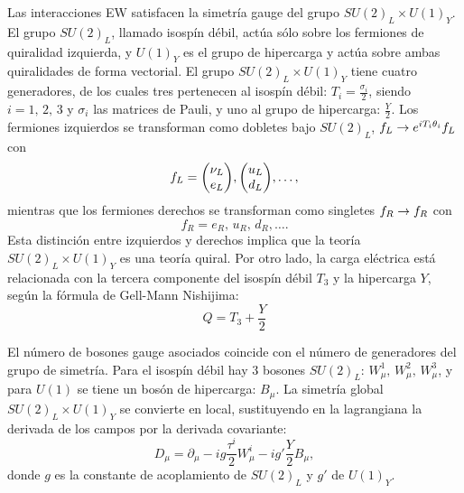 Las interacciones \ac{EW} satisfacen la simetría gauge del grupo \(SU(2)_L \times U(1)_Y\). El grupo \(SU(2)_L\), llamado isospín débil, actúa sólo sobre los fermiones de quiralidad izquierda, y \(U(1)_Y\) es el grupo de hipercarga y actúa sobre ambas quiralidades de forma vectorial.
El grupo \(SU(2)_L \times U(1)_Y\) tiene cuatro generadores, de los cuales tres pertenecen al isospín débil: \(T_i = \frac{\sigma_i}{2}\), siendo \(i = 1,\, 2,\, 3\) y \(\sigma_i\) las matrices de Pauli, y uno al grupo de hipercarga: \(\frac{Y}{2}\). Los fermiones izquierdos se transforman como dobletes bajo \(SU(2)_L\), \(f_L \rightarrow e^{i T_i \theta_i} f_L\) con
\begin{equation}
    f_L = \mqty( \nu_L\\ e_L ), \mqty( u_L\\ d_L ), \dots,
\end{equation}
mientras que los fermiones derechos se transforman como singletes \(f_R \rightarrow f_R\) con
\begin{equation}
    f_R = e_R, \, u_R,\, d_R, \dots.
\end{equation}
Esta distinción entre izquierdos y derechos implica que la teoría \(SU(2)_L \times U(1)_Y\) es una teoría quiral.
Por otro lado, la carga eléctrica está relacionada con la tercera componente del isospín débil \(T_3\) y la hipercarga \(Y\), según la fórmula de Gell-Mann Nishijima:
\begin{equation}
    Q = T_3 + \frac{Y}{2}
\end{equation}

El número de bosones gauge asociados coincide con el número de generadores del grupo de simetría. Para el isospín débil hay 3 bosones \(SU(2)_L\): \(W_{\mu}^1,\, W_{\mu}^2,\, W_{\mu}^3\), y para \(U(1)\) se tiene un bosón de hipercarga: \(B_{\mu}\).
La simetría global \(SU(2)_L \times U(1)_Y\) se convierte en local, sustituyendo en la lagrangiana la derivada de los campos por la derivada covariante:
\begin{equation}
    \label{eq:theory:sm:mathematical:ew:covariant_derivative}
    D_{\mu} = \partial_{\mu} - ig \frac{\tau^i}{2} W_{\mu}^i - i g' \frac{Y}{2} B_{\mu},
\end{equation}
donde \(g\) es la constante de acoplamiento de \(SU(2)_L\) y \(g'\) de \(U(1)_Y\).

